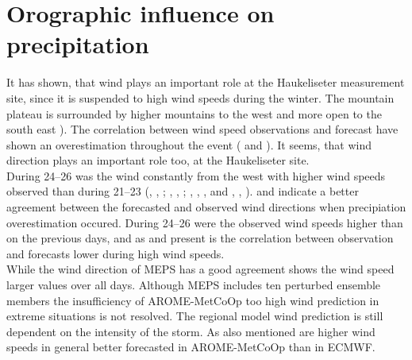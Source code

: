 \section{Orographic influence on precipitation}\label{sec:res:oro_infl}
It has shown, that wind plays an important role at the Haukeliseter measurement site, since it is suspended to high wind speeds during the winter. The mountain plateau is surrounded by higher mountains to the west and more open to the south east \citep{wolff_measurements_2013,wolff_derivation_2015}). The correlation between wind speed observations and forecast have shown an overestimation throughout the event ( and ). It seems, that wind direction plays an important role too, at the Haukeliseter site. 
\\
During \SIrange{24}{26}{\dec} was the wind constantly from the west with higher wind speeds observed than during \SIrange{21}{23}{\dec} (, , ; , , ; , , , and , , ).  and  indicate a better agreement between the forecasted and observed wind directions when precipiation overestimation occured. During \SIrange{24}{26}{\dec} were the observed wind speeds higher than on the previous days, and as  and  present is the correlation between observation and forecasts lower during high wind speeds.
\\
While the wind direction of MEPS has a good agreement shows the wind speed larger values over all days. Although MEPS includes ten perturbed ensemble members the insufficiency of AROME-MetCoOp too high wind prediction in extreme situations is not resolved. The regional model wind prediction is still dependent on the intensity of the storm. As \cite{muller_arome-metcoop:_2017} also mentioned are higher wind speeds in general better forecasted in AROME-MetCoOp than in ECMWF. 


